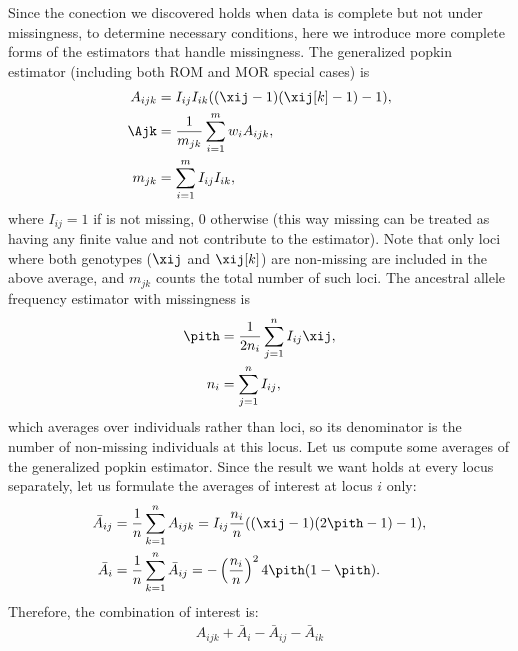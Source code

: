 \documentclass[11pt]{article}
\begin{document}
\begin{appendices}
  Since the conection we discovered holds when data is complete but not under missingness, to determine necessary conditions, here we introduce more complete forms of the estimators that handle missingness.
  The generalized popkin estimator (including both ROM and MOR special cases) is
  \begin{equation*}
    \begin{split}
      A_{ijk}
      &=
        I_{ij} I_{ik} ( (\xij-1)(\xij[k]-1) - 1 )
      , \\
      \Ajk
      &=
        \frac{1}{m_{jk}} \sum_{i=1}^m w_i A_{ijk}
        , \\
      m_{jk}
      &=
        \sum_{i=1}^m I_{ij} I_{ik}
        ,
    \end{split}
  \end{equation*}
  where $I_{ij} = 1$ if \xij is not missing, 0 otherwise (this way missing \xij can be treated as having any finite value and not contribute to the estimator).
  Note that only loci where both genotypes ($\xij$ and $\xij[k]$) are non-missing are included in the above average, and $m_{jk}$ counts the total number of such loci.
  The ancestral allele frequency estimator with missingness is
  \begin{align*}
    \pith
    &=
      \frac{1}{2 n_i} \sum_{j=1}^n I_{ij} \xij
      , \\
    n_i
    &=
      \sum_{j=1}^n I_{ij}
      ,
  \end{align*}
  which averages over individuals rather than loci, so its denominator is the number of non-missing individuals at this locus.
  Let us compute some averages of the generalized popkin estimator.
  Since the result we want holds at every locus separately, let us formulate the averages of interest at locus $i$ only:
  \begin{align*}
    \bar{A}_{ij}
    &=
      \frac{1}{n} \sum_{k=1}^n A_{ijk}
      =
      I_{ij} \frac{n_i}{n} ( ( \xij - 1 )( 2 \pith - 1 ) - 1 )
      , \\
    \bar{A}_i
    &=
      \frac{1}{n} \sum_{k=1}^n \bar{A}_{ij}
      =
      - \left( \frac{n_i}{n} \right)^2 4 \pith ( 1 - \pith )
      .
  \end{align*}
  Therefore, the combination of interest is:
  \begin{align*}
    A_{ijk} + \bar{A}_i - \bar{A}_{ij}  - \bar{A}_{ik}

\end{align*}
\end{appendices}
\end{document}
